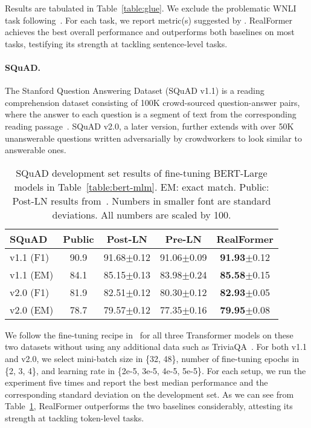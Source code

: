 \documentclass[11pt,a4paper]{article}
\begin{document}
Results are tabulated in Table~\ref{table:glue}. We exclude the problematic WNLI task following~\citet{Devlin-2019-bert}. For each task, we report metric(s) suggested by \citet{Wang-2018-glue}. RealFormer achieves the best overall performance and outperforms both baselines on most tasks, testifying its strength at tackling sentence-level tasks.



\paragraph{SQuAD.}
The Stanford Question Answering Dataset (SQuAD v1.1) is a reading comprehension dataset consisting of 100K crowd-sourced question-answer pairs, where the answer to each question is a segment of text from the corresponding reading passage~\citep{Rajpurkar-2016-squad}.
SQuAD v2.0, a later version, further extends with over 50K unanswerable questions written adversarially by crowdworkers to look similar to answerable ones.


\begin{table}[t]
\setlength{\tabcolsep}{0.9pt}
\centering
\begin{tabular}{l|cccc}
\hline \textbf{SQuAD} &\textbf{Public}  & \textbf{Post-LN} & \textbf{Pre-LN} & \textbf{RealFormer} \\ \hline
v1.1 \small{(F1)}   & 90.9  & 91.68\tiny{$\pm$0.12}  & 91.06\tiny{$\pm$0.09}    & \textbf{91.93}\tiny{$\pm$0.12}   \\
v1.1 \small{(EM)}   & 84.1  & 85.15\tiny{$\pm$0.13}  & 83.98\tiny{$\pm$0.24}    & \textbf{85.58}\tiny{$\pm$0.15}   \\
v2.0 \small{(F1)}   & 81.9  & 82.51\tiny{$\pm$0.12}  & 80.30\tiny{$\pm$0.12}    & \textbf{82.93}\tiny{$\pm$0.05}   \\
v2.0 \small{(EM)}   & 78.7  & 79.57\tiny{$\pm$0.12}  & 77.35\tiny{$\pm$0.16}    & \textbf{79.95}\tiny{$\pm$0.08}  \\
\hline
\end{tabular}
\caption{\label{table:squad} SQuAD development set results of fine-tuning BERT-Large models in Table~\ref{table:bert-mlm}. EM: exact match. Public: Post-LN results from~\citet{Devlin-2019-bert}. Numbers in smaller font are standard deviations. All numbers are scaled by 100.}
\end{table}


We follow the fine-tuning recipe in~\citet{Devlin-2019-bert} for all three Transformer models on these two datasets without using any additional data such as TriviaQA~\citep{Joshi-2017-triviaqa}.
For both v1.1 and v2.0, we select mini-batch size in \{32, 48\}, number of fine-tuning epochs in \{2, 3, 4\}, and learning rate in \{2e-5, 3e-5, 4e-5, 5e-5\}. For each setup, we run the experiment five times and report the best median performance and the corresponding standard deviation on the development set. As we can see from Table~\ref{table:squad}, RealFormer outperforms the two baselines considerably, attesting its strength at tackling token-level tasks.
\end{document}
